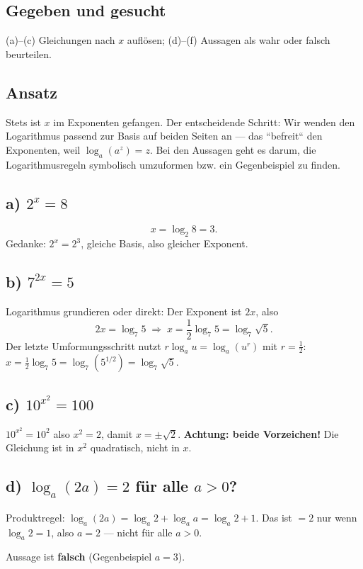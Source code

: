 

\subsection*{Gegeben und gesucht}
(a)--(c) Gleichungen nach $x$ auflösen; (d)--(f) Aussagen als wahr oder
falsch beurteilen.

\subsection*{Ansatz}
Stets ist $x$ im Exponenten gefangen. Der entscheidende Schritt: Wir
wenden den Logarithmus passend zur Basis auf beiden Seiten an --- das
``befreit`` den Exponenten, weil $\log_a(a^z)=z$. Bei den Aussagen geht es
darum, die Logarithmusregeln symbolisch umzuformen bzw. ein
Gegenbeispiel zu finden.

\subsection*{a) $2^x=8$}
\begin{equation}
  x=\log_2 8=3 .
\end{equation}
Gedanke: $2^x=2^3$, gleiche Basis, also gleicher Exponent.

\subsection*{b) $7^{2x}=5$}
Logarithmus grundieren oder direkt: Der Exponent ist $2x$, also
\begin{equation}
  2x=\log_7 5 \;\Longrightarrow\; x=\frac12\log_7 5=\log_7\sqrt5 .
\end{equation}
Der letzte Umformungsschritt nutzt $r\log_a u=\log_a(u^r)$ mit $r=\tfrac12$:
$x=\tfrac12\log_7 5=\log_7(5^{1/2})=\log_7\sqrt5$.

\subsection*{c) $10^{x^2}=100$}
$10^{x^2}=10^2$ also $x^2=2$, damit $x=\pm\sqrt2$. \textbf{Achtung: beide
Vorzeichen!} Die Gleichung ist in $x^2$ quadratisch, nicht in $x$.

\subsection*{d) $\log_a(2a)=2$ für alle $a>0$?}
Produktregel: $\log_a(2a)=\log_a2+\log_a a=\log_a2+1$. Das ist $=2$ nur
wenn $\log_a 2=1$, also $a=2$ --- nicht für alle $a>0$.
\begin{ergebnis} Aussage ist \textbf{falsch} (Gegenbeispiel $a=3$). \end{ergebnis}

